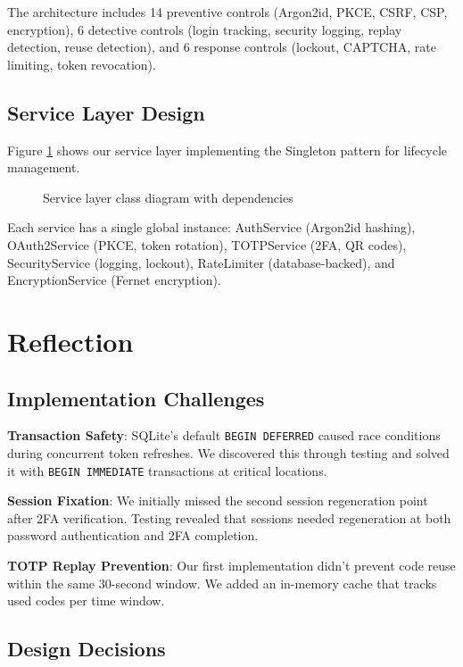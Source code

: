 \documentclass[12pt,a4paper]{article}
\begin{document}
The architecture includes 14 preventive controls (Argon2id, PKCE, CSRF, CSP, encryption), 6 detective controls (login tracking, security logging, replay detection, reuse detection), and 6 response controls (lockout, CAPTCHA, rate limiting, token revocation).

\subsection{Service Layer Design}

Figure \ref{fig:classes} shows our service layer implementing the Singleton pattern for lifecycle management.

\begin{figure}[H]
    \centering
    
    \caption{Service layer class diagram with dependencies}
    \label{fig:classes}
\end{figure}

Each service has a single global instance: AuthService (Argon2id hashing), OAuth2Service (PKCE, token rotation), TOTPService (2FA, QR codes), SecurityService (logging, lockout), RateLimiter (database-backed), and EncryptionService (Fernet encryption).

\section{Reflection}

\subsection{Implementation Challenges}

\textbf{Transaction Safety}: SQLite's default \texttt{BEGIN DEFERRED} caused race conditions during concurrent token refreshes. We discovered this through testing and solved it with \texttt{BEGIN IMMEDIATE} transactions at critical locations.

\textbf{Session Fixation}: We initially missed the second session regeneration point after 2FA verification. Testing revealed that sessions needed regeneration at both password authentication and 2FA completion.

\textbf{TOTP Replay Prevention}: Our first implementation didn't prevent code reuse within the same 30-second window. We added an in-memory cache that tracks used codes per time window.

\subsection{Design Decisions}
\end{document}
